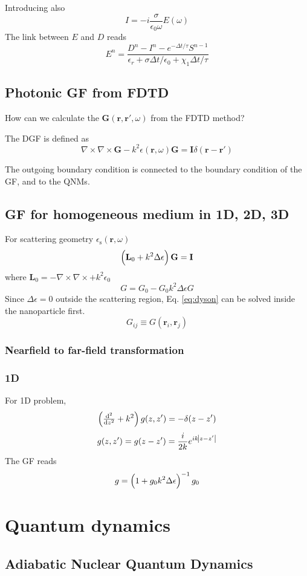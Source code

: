 \documentclass[a4paper,12pt]{book}
\newcommand{\eq}[1]{Eq. \eqref{#1}}
\renewcommand{\bf}[1]{\mathbf{#1}}
\newcommand{\grad}{\nabla}
\newcommand{\be}{\begin{equation}}
\newcommand{\ee}{\end{equation}}
\renewcommand{\bf}[1]{\mathbf{#1}}
\renewcommand{\bf}{\mathbf}
\begin{document}
Introducing also
\be I = - i \frac{\sigma}{\epsilon_0 \omega} E(\omega)
\ee
The link between $E$ and $D$ reads
\be
E^n = \frac{ D^n - I^n - e^{-\Delta t/\tau}	S^{n-1}}{\epsilon_r + \sigma\Delta t/\epsilon_0+  \chi_1 \Delta t/\tau}
\ee

\section{Photonic GF from FDTD}
How can we calculate the $\bf G(\bf r, \bf r', \omega)$ from the FDTD method?


The DGF is defined as
\be
\grad \times \grad \times \bf G - k^2 \epsilon(\bf r, \omega) \bf G = \bf I \delta(\bf r - \bf r')
\ee

 The outgoing boundary condition is connected to the boundary condition of the GF, and to the QNMs.

 \section{GF for homogeneous medium in 1D, 2D, 3D}

 For scattering geometry $\epsilon_\text{s}(\bf r, \omega)$
 \be \del{\bf L_0 + k^2 \Delta \epsilon} \bf G = \bf I
 \ee
 where $ \bf L_0 = -\grad \times \grad \times + k^2 \epsilon_0 $
 \be
 G  = G_0 - G_0  k^2 \Delta \epsilon G
\label{eq:dyson}
 \ee
 Since $\Delta \epsilon = 0$ outside the scattering region, \eq{eq:dyson} can be solved inside the nanoparticle first.
 \be G_{ij} \equiv G(\bf r_i, \bf r_j) \ee

 \subsection{Nearfield to far-field transformation}

 \subsection{1D}
 For 1D problem,
 \be \del{ \od[2]{}{z} + k^2 } g(z,z') = -\delta(z-z')
 \ee
 \be g(z,z') = g(z-z') = \frac{i}{2k}e^{i k \abs{z-z'}}
 \ee
 The GF reads
 \be
 g = \del{1 + g_0k^2 \Delta \epsilon  }^{-1} g_0
 \ee


\chapter{Quantum dynamics}



\section{ Adiabatic Nuclear Quantum Dynamics}
\end{document}
